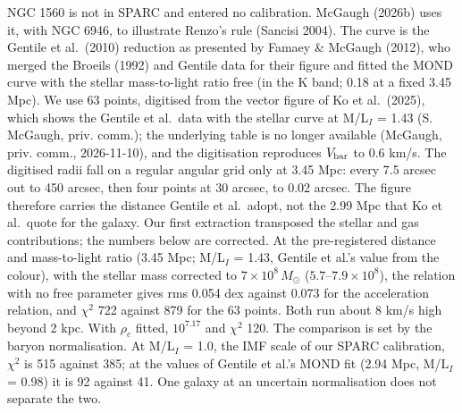\documentclass[
  10pt,
]{article}
\begin{document}
NGC 1560 is not in SPARC and entered no calibration. McGaugh (2026b) uses it, with NGC 6946, to illustrate Renzo's rule (Sancisi 2004). The curve is the Gentile et al.~(2010) reduction as presented by Famaey \& McGaugh (2012), who merged the Broeils (1992) and Gentile data for their figure and fitted the MOND curve with the stellar mass-to-light ratio free (in the K band; 0.18 at a fixed 3.45 Mpc). We use 63 points, digitised from the vector figure of Ko et al.~(2025), which shows the Gentile et al.\ data with the stellar curve at M/L$_I$ = 1.43 (S. McGaugh, priv. comm.); the underlying table is no longer available (McGaugh, priv. comm., 2026-11-10), and the digitisation reproduces $V_{\rm bar}$ to 0.6 km/s. The digitised radii fall on a regular angular grid only at 3.45 Mpc: every 7.5 arcsec out to 450 arcsec, then four points at 30 arcsec, to 0.02 arcsec. The figure therefore carries the distance Gentile et al.\ adopt, not the 2.99 Mpc that Ko et al.\ quote for the galaxy. Our first extraction transposed the stellar and gas contributions; the numbers below are corrected. At the pre-registered distance and mass-to-light ratio (3.45 Mpc; M/L$_I$ = 1.43, Gentile et al.'s value from the colour), with the stellar mass corrected to $7\times10^8\,M_\odot$ ($5.7$--$7.9\times10^8$), the relation with no free parameter gives rms 0.054 dex against 0.073 for the acceleration relation, and $\chi^2$ 722 against 879 for the 63 points. Both run about 8 km/s high beyond 2 kpc. With $\rho_c$ fitted, $10^{7.17}$ and $\chi^2$ 120. The comparison is set by the baryon normalisation. At M/L$_I$ = 1.0, the IMF scale of our SPARC calibration, $\chi^2$ is 515 against 385; at the values of Gentile et al.'s MOND fit (2.94 Mpc, M/L$_I$ = 0.98) it is 92 against 41. One galaxy at an uncertain normalisation does not separate the two.
\end{document}
